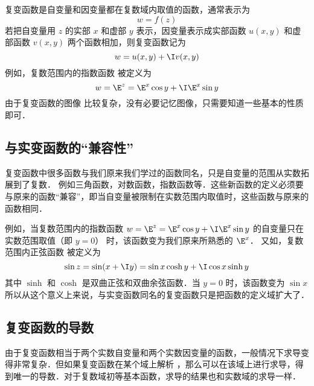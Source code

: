 
复变函数是自变量和因变量都在复数域内取值的函数，通常表示为
\begin{equation}
w = f(z)
\end{equation}
若把自变量用 $z$ 的实部 $x$ 和虚部 $y$ 表示，因变量表示成实部函数 $u(x,y)$ 和虚部函数 $v(x,y)$ 两个函数相加，则复变函数记为
\begin{equation}
w = u(x,y) + \I v(x,y)
\end{equation}
例如，复数范围内的指数函数%
被定义为
\begin{equation}
w = \E^z = \E^x \cos y + \I \E^x\sin y
\end{equation}
由于复变函数的图像%
比较复杂，没有必要记忆图像，只需要知道一些基本的性质即可．

\subsection{与实变函数的“兼容性”}
复变函数中很多函数与我们原来我们学过的函数同名，只是自变量的范围从实数拓展到了复数． 例如三角函数，对数函数，指数函数等．这些新函数的定义必须要与原来的函数“兼容”，即当自变量被限制在实数范围内取值时，这些函数与原来的函数相同．

例如，当复数范围内的指数函数%
 $w = \E^z = \E^x \cos y + \I \E^x \sin y$ 的自变量只在实数范围取值（即 $y = 0$） 时，该函数变为我们原来所熟悉的 $\E^x$． 
又如，复数范围内正弦函数%
被定义为
\begin{equation}
\sin z = \sin(x + \I y) = \sin x\cosh y + \I\cos x\sinh y
\end{equation}
其中 $\sinh $ 和 $\cosh $ 是双曲正弦和双曲余弦函数．当 $y = 0$ 时，该函数变为 $\sin x$ 
所以从这个意义上来说，与实变函数同名的复变函数只是把函数的定义域扩大了．

\subsection{复变函数的导数}
由于复变函数相当于两个实数自变量和两个实数因变量的函数，一般情况下求导变得非常复杂．但如果复变函数在某个域上解析%
，那么可以在该域上进行求导，得到唯一的导数．对于复数域初等基本函数，求导的结果也和实数域的求导一样．


